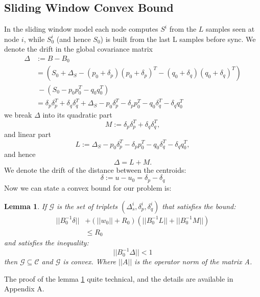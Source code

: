 \documentclass[11pt,twocolumn,varwidth=true,a4paper,fleqn]{article}
\newtheorem{lemma}{Lemma}
\begin{document}
\subsection{Sliding Window Convex Bound}
In the sliding window model each node computes $S^i$ from the $L$ samples seen
at node $i$, while $S_0^i$ (and hence $S_0$) is built from the last L samples before
sync. 
We denote the drift in the global covariance matrix
\begin{equation*}
\begin{split}
\Delta & :=B-B_0 \\
& = (S_0+\Delta_S - (p_0+\delta_p)(p_0+\delta_p)^T -
(q_0+\delta_q)(q_0+\delta_q)^T) \\
& \ - (S_0 - p_0p_0^T - q_0q_0^T) \\
& = \delta_p\delta_p^T + \delta_q\delta_q^T + \Delta_S - p_0\delta_p^T -
\delta_pp_0^T - q_0\delta_q^T - \delta_qq_0^T
\end{split}
\end{equation*}
we break $\Delta$ into its quadratic part
\begin{equation*}
M:=\delta_p\delta_p^T + \delta_q\delta_q^T, 
\end{equation*}
and linear part
\begin{equation*}
L:= \Delta_S - p_0\delta_p^T - \delta_pp_0^T - q_0\delta_q^T - \delta_qq_0^T, 
\end{equation*}
and hence 
\begin{equation*}
\Delta= L+ M.
\end{equation*}
We denote the drift of the distance between the centroids:
\begin{equation*}
\delta:= u-u_0 = \delta_p - \delta_q
\end{equation*}
Now we can state a convex bound for our problem is:
\begin{lemma} \label{convexBound}
If $\mathcal{G}$ is the set of triplets $(\Delta_s^i, \delta_p^i, \delta_q^i)$
 that satisfies the bound:
 \begin{equation*} 
\begin{split}
||B_0^{-1}\delta|| &+ (||w_0||+R_0)(||B_0^{-1}L||+||B_0^{-1}M||) \\ & \leq  R_0
\end{split}
\end{equation*}
and satisfies the inequality:
 \begin{equation*} 
||B_0^{-1}\Delta|| < 1
\end{equation*}
 then $\mathcal{G}
 \subseteq \mathcal{C}$ and $\mathcal{G}$ is convex.
Where $||A||$ is the operator norm of the matrix A.
\end{lemma}
The proof of the lemma \ref{convexBound} quite technical, and
the details are available in Appendix A.
\end{document}
